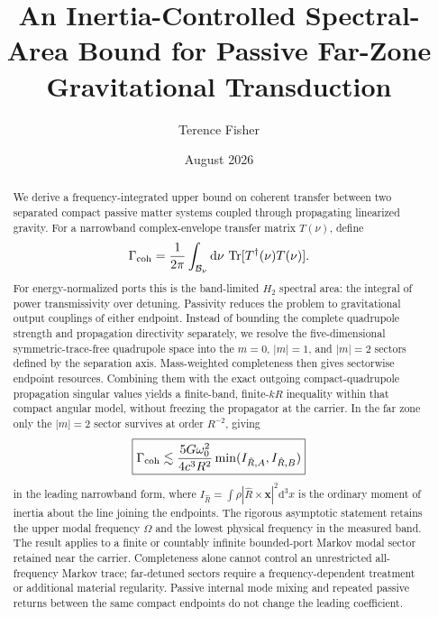 \documentclass[aps,prd,reprint,nofootinbib,superscriptaddress,longbibliography]{revtex4-2}
\newcommand{\dd}{\mathrm d}
\newcommand{\Tr}{\operatorname{Tr}}
\begin{document}
\title{An Inertia-Controlled Spectral-Area Bound for Passive Far-Zone Gravitational Transduction}

\author{Terence Fisher}

\date{August 2026}

\begin{abstract}
We derive a frequency-integrated upper bound on coherent transfer between two separated compact passive matter systems coupled through propagating linearized gravity. For a narrowband complex-envelope transfer matrix $T(\nu)$, define
\begin{equation}
\Gamma_{\rm coh}=\frac{1}{2\pi}\int_{\mathcal B_\nu}\dd\nu\,\Tr[T^\dagger(\nu)T(\nu)].
\end{equation}
For energy-normalized ports this is the band-limited $H_2$ spectral area: the integral of power transmissivity over detuning. Passivity reduces the problem to gravitational output couplings of either endpoint. Instead of bounding the complete quadrupole strength and propagation directivity separately, we resolve the five-dimensional symmetric-trace-free quadrupole space into the $m=0$, $|m|=1$, and $|m|=2$ sectors defined by the separation axis. Mass-weighted completeness then gives sectorwise endpoint resources. Combining them with the exact outgoing compact-quadrupole propagation singular values yields a finite-band, finite-$kR$ inequality within that compact angular model, without freezing the propagator at the carrier. In the far zone only the $|m|=2$ sector survives at order $R^{-2}$, giving
\begin{equation}
\boxed{
\Gamma_{\rm coh}
\lesssim
\frac{5G\omega_0^2}{4c^3R^2}
\min(I_{\hat R,A},I_{\hat R,B})
}
\end{equation}
in the leading narrowband form, where $I_{\hat R}=\int\rho |\hat R\times\bm x|^2\dd^3x$ is the ordinary moment of inertia about the line joining the endpoints. The rigorous asymptotic statement retains the upper modal frequency $\Omega$ and the lowest physical frequency in the measured band. The result applies to a finite or countably infinite bounded-port Markov modal sector retained near the carrier. Completeness alone cannot control an unrestricted all-frequency Markov trace; far-detuned sectors require a frequency-dependent treatment or additional material regularity. Passive internal mode mixing and repeated passive returns between the same compact endpoints do not change the leading coefficient.
\end{abstract}
\end{document}
